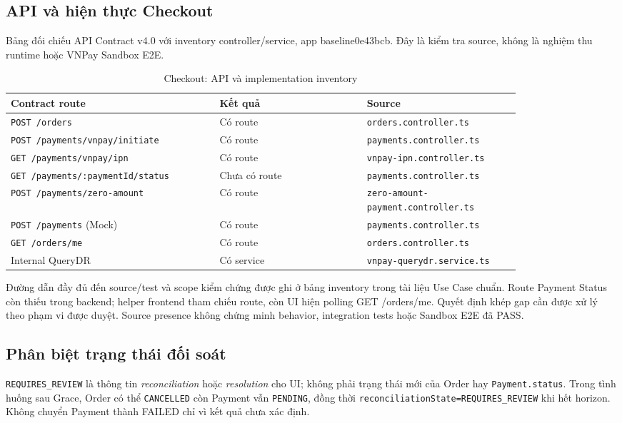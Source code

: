 \subsection{API và hiện thực Checkout}
Bảng đối chiếu API Contract v4.0 với inventory controller/service, app
baseline0e43bcb. Đây là kiểm tra source, không là nghiệm thu runtime hoặc
VNPay Sandbox E2E.
\begin{longtable}{|p{0.34\linewidth}|p{0.24\linewidth}|p{0.25\linewidth}|}
\caption{Checkout: API và implementation inventory}\label{tab:auto-checkout-use-case-3}\\
\hline
\textbf{Contract route} & \textbf{Kết quả} & \textbf{Source} \\ \hline
\texttt{POST /orders} & Có route & \texttt{orders.controller.ts} \\ \hline
\texttt{POST /payments/vnpay/initiate} & Có route & \texttt{payments.controller.ts} \\ \hline
\texttt{GET /payments/vnpay/ipn} & Có route & \texttt{vnpay-ipn.controller.ts} \\ \hline
\texttt{GET /payments/:paymentId/status} & Chưa có route & \texttt{payments.controller.ts} \\ \hline
\texttt{POST /payments/zero-amount} & Có route & \texttt{zero-amount-}\newline\texttt{payment.controller.ts} \\ \hline
\texttt{POST /payments} (Mock) & Có route & \texttt{payments.controller.ts} \\ \hline
\texttt{GET /orders/me} & Có route & \texttt{orders.controller.ts} \\ \hline
Internal QueryDR & Có service & \texttt{vnpay-querydr.service.ts} \\ \hline
\end{longtable}
Đường dẫn đầy đủ đến source/test và scope kiểm chứng được ghi ở bảng
inventory trong tài liệu Use Case chuẩn. Route Payment Status còn thiếu trong
backend; helper frontend tham chiếu route, còn UI hiện polling GET /orders/me.
Quyết định khép gap cần được xử lý theo phạm vi được duyệt. Source presence
không chứng minh behavior, integration tests hoặc Sandbox E2E đã PASS.

\subsection{Phân biệt trạng thái đối soát}
\texttt{REQUIRES\_REVIEW} là thông tin \emph{reconciliation} hoặc
\emph{resolution} cho UI; không phải trạng thái mới của Order hay
\texttt{Payment.status}. Trong tình huống sau Grace, Order có thể
\texttt{CANCELLED} còn Payment vẫn \texttt{PENDING}, đồng thời
\texttt{reconciliationState=REQUIRES\_REVIEW} khi hết horizon.
Không chuyển Payment thành FAILED chỉ vì kết quả chưa xác định.
